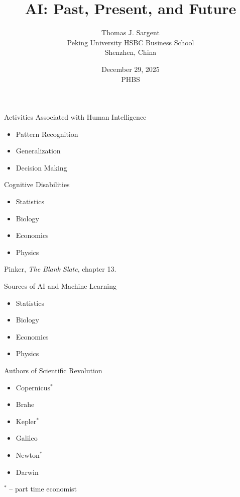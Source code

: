\documentclass[aspectratio=169]{beamer}
\title{AI: Past, Present, and Future\\
}
\author{Thomas J. Sargent \\
Peking University HSBC Business School   \\
Shenzhen, China}
\date{December 29, 2025 \\
PHBS}
\theoremstyle{Definition}
\begin{document}
\begin{frame}
\titlepage
\end{frame}

\begin{frame}{Activities Associated with  Human Intelligence}

\begin{itemize}
\item Pattern Recognition
\item Generalization
\item Decision Making
\end{itemize}

\end{frame}


\begin{frame}{Cognitive Disabilities}
\begin{itemize}
\item Statistics
\item Biology
\item Economics
\item Physics
\end{itemize}

\quad \quad \quad Pinker, {\em The Blank Slate}, chapter 13.

\end{frame}


\begin{frame}{Sources of AI and Machine Learning}
\begin{itemize}
\item Statistics
\item Biology
\item Economics
\item Physics
\end{itemize}
\end{frame}



\begin{frame}{Authors of Scientific Revolution}
\begin{itemize}
\item Copernicus{\color{red}$^*$}
\item Brahe
\item Kepler{\color{red}$^*$}
\item Galileo
\item Newton{\color{red}$^*$}
\item Darwin
\end{itemize}

\medskip
\medskip

{\color{red}$^*$} -- part time economist

\end{frame}
\end{document}

